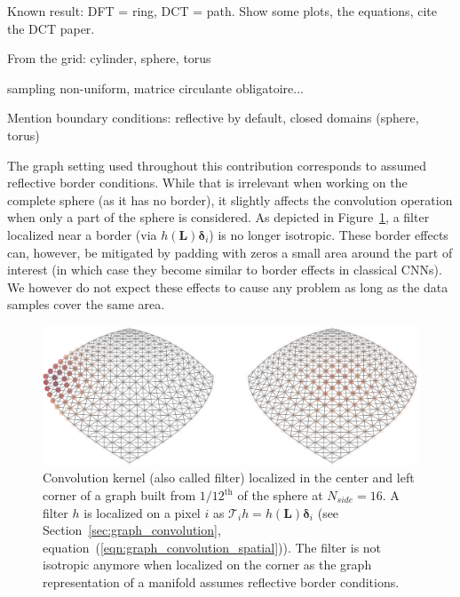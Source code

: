 \documentclass{article} %
\newcommand{\figref}[1]{Figure~\ref{fig:#1}}
\newcommand{\secref}[1]{Section~\ref{sec:#1}}
\newcommand{\eqnref}[1]{(\ref{eqn:#1})}
\renewcommand{\b}[1]{{\bm{#1}}}   %
\newcommand{\1}{\b{1}}              %
\newcommand{\0}{\b{0}}              %
\renewcommand{\L}{\b{L}}
\newcommand{\T}{\mathcal{T}}
\begin{document}
Known result: DFT = ring, DCT = path. Show some plots, the equations, cite the DCT paper.

From the grid: cylinder, sphere, torus


sampling non-uniform, matrice circulante obligatoire...


Mention boundary conditions: reflective by default, closed domains (sphere, torus)

The graph setting used throughout this contribution corresponds to assumed reflective border conditions.
While that is irrelevant when working on the complete sphere (as it has no border), it slightly affects the convolution operation when only a part of the sphere is considered.
As depicted in \figref{border_effects}, a filter localized near a border (via $h(\L) \b \delta_i$) is no longer isotropic.
These border effects can, however, be mitigated by padding with zeros a small area around the part of interest (in which case they become similar to border effects in classical CNNs).
We however do not expect these effects to cause any problem as long as the data samples cover the same area.

\begin{figure}[ht!]
	\centering
	\includegraphics[width=\linewidth]{border_effects}
	\caption{Convolution kernel (also called filter) localized in the center and left corner of a graph built from $1/12^\text{th}$ of the sphere at $N_{side} = 16$.
		A filter $h$ is localized on a pixel $i$ as $\T_i h = h(\L) \b \delta_i$ (see \secref{graph_convolution}, equation~\eqnref{graph_convolution_spatial}).
	The filter is not isotropic anymore when localized on the corner as the graph representation of a manifold assumes reflective border conditions.}
	\label{fig:border_effects}
\end{figure}
\end{document}
